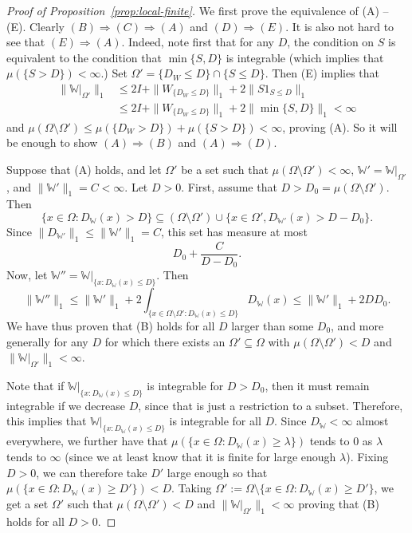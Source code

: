 \documentclass{amsart}
\numberwithin{equation}{section}
\numberwithin{figure}{section}
\theoremstyle{definition}
\theoremstyle{remark}
\newcommand{\cW}{\mathbb{W}}
\begin{document}
\begin{proof}[Proof of Proposition~\ref{prop:local-finite}]
We first prove the equivalence of (A) -- (E). Clearly $(B) \Rightarrow
(C)\Rightarrow (A)$ and $(D) \Rightarrow (E)$. It is also not hard to see
that $(E) \Rightarrow (A)$. Indeed, note first that for any $D$, the
condition on $S$ is equivalent to the condition that $\min\{S,D\}$ is
integrable (which implies that $\mu(\{S>D\})<\infty$.) Set $\Omega'=\{D_W\leq
D\}\cap \{S\leq D\}$. Then (E) implies that
\begin{align*}
\|\cW|_{\Omega'}\|_1&\leq 2 I + \|W_{\{D_W\leq D\}}\|_1
+2\|S 1_{S\leq D}\|_1\\
& \le 2 I + \|W_{\{D_W\leq D\}}\|_1
+2\|\min\{S,D\}\|_1<\infty
\end{align*}
and $\mu(\Omega\setminus\Omega')\leq \mu(\{D_W>D\})+\mu(\{S>D\})<\infty$,
proving (A). So it will be enough to show $(A) \Rightarrow (B)$ and $(A)
\Rightarrow (D)$.

Suppose that (A) holds, and let $\Omega'$ be a set such that $\mu(\Omega
\setminus \Omega')<\infty$, $\cW' = \cW|_{\Omega'}$, and $\|\cW'\|_1 = C <
\infty$. Let $D>0$. First, assume that $D>D_0=\mu(\Omega \setminus \Omega')$.
Then
\[
\{x \in \Omega: D_\cW(x) > D\} \subseteq (\Omega \setminus \Omega') \cup \{x \in \Omega', D_{\cW'}(x) > D-D_0 \}.
\]
Since $\|D_{\cW'}\|_1 \le \|\cW'\|_1=C$, this set has measure at most
\[
D_0+ \frac{C}{D-D_0}.
\]
Now, let $\cW''=\cW|_{\{x:D_\cW(x) \le D\}}$. Then
\[
\|\cW''\|_1 \le \| \cW'\|_1
+ 2 \int_{\{ x \in \Omega \setminus \Omega': D_\cW(x) \le D\}} D_\cW(x)
\le \|\cW'\|_1 + 2DD_0.
\]
We have thus proven that (B) holds for all $D$ larger than some $D_0$, and
more generally for any $D$ for which there exists an $\Omega' \subseteq
\Omega$ with $\mu(\Omega \setminus \Omega')<D$ and $\|\cW|_{\Omega'}\|_1
<\infty$.

Note that if $\cW|_{\{x:D_\cW(x) \le D\}}$ is integrable for $D>D_0$, then it
must remain integrable if we decrease $D$, since that is just a restriction
to a subset. Therefore, this implies that $\cW|_{\{x:D_\cW(x) \le D\}}$ is
integrable for all $D$. Since $D_\cW<\infty$ almost everywhere, we further
have that $\mu(\{x \in \Omega: D_\cW(x) \ge \lambda\})$ tends to $0$ as
$\lambda$ tends to $\infty$ (since we at least know that it is finite for
large enough $\lambda$). Fixing $D>0$, we can therefore take $D'$ large
enough so that $\mu(\{x \in \Omega: D_\cW(x) \ge D'\})<D$. Taking
$\Omega':=\Omega \setminus \{x \in \Omega: D_\cW(x) \ge D'\}$, we get a set
$\Omega'$ such that $\mu(\Omega \setminus \Omega')<D$ and
$\|\cW|_{\Omega'}\|_1 <\infty$ proving that (B) holds for all $D>0$.


\end{proof}
\end{document}
